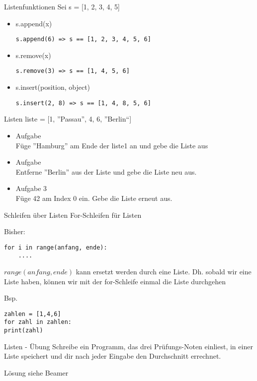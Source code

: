 \begin{frame}[fragile]{Listenfunktionen}
Sei s = [1, 2, 3, 4, 5]
\begin{itemize}
	\item s.append(x)
	\begin{lstlisting}
s.append(6) => s == [1, 2, 3, 4, 5, 6]
	\end{lstlisting}
	\item s.remove(x)
	\begin{lstlisting}
s.remove(3) => s == [1, 4, 5, 6]
	\end{lstlisting}
	\item s.insert(position, object)
	\begin{lstlisting}
s.insert(2, 8) => s == [1, 4, 8, 5, 6]
	\end{lstlisting}
\end{itemize}
\end{frame}

\begin{frame}[fragile]{Listen}
liste = [1, ''Passau'', 4, 6, ''Berlin``]
\begin{itemize}
\item Aufgabe \\
Füge ''Hamburg'' am Ende der liste1 an und gebe die Liste aus

\item Aufgabe \\
Entferne ''Berlin'' aus der Liste und gebe die Liste neu aus. 

\item Aufgabe 3\\
Füge 42 am Index 0 ein. Gebe die Liste erneut aus.
\end{itemize}
\end{frame}

\begin{frame}[fragile]{Schleifen über Listen}
For-Schleifen für Listen

Bisher:
\begin{lstlisting}
for i in range(anfang, ende):
	....
\end{lstlisting}

$range(anfang, ende)$ kann ersetzt werden durch eine Liste.
Dh. sobald wir eine Liste haben, können wir mit der for-Schleife einmal die Liste durchgehen

Bsp. 
\begin{lstlisting}
zahlen = [1,4,6]
for zahl in zahlen:
print(zahl)
\end{lstlisting}
\end{frame}

\begin{frame}[fragile]{Listen - Übung}
Schreibe ein Programm, das drei Prüfungs-Noten einliest, in einer
Liste speichert und dir nach jeder Eingabe den Durchschnitt errechnet. 
\pause{}
\begin{exampleblock}{Lösung}
siehe Beamer
\end{exampleblock}
\end{frame}

